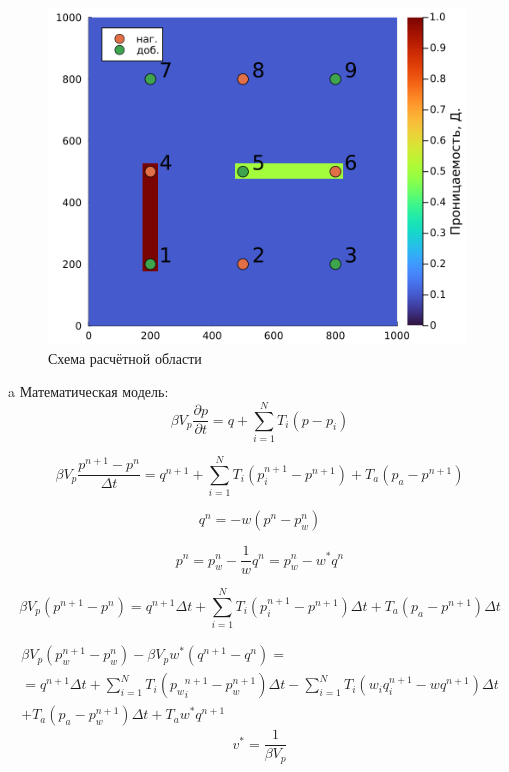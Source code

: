 \documentclass[14pt]{article}
\begin{document}
\begin{figure}
	\centering
	\includegraphics[width=0.7\linewidth]{pic/screenshot001}
	\caption{Схема расчётной области}
	\label{fig:screenshot001}
\end{figure}
a
	Математическая модель:
\begin{equation}\label{mm}
	\beta V_p\frac{\partial p}{\partial t} = q + \sum_{i=1}^{N}T_i\left(p-p_i\right)
\end{equation}

\begin{equation}\label{mm1}
	\beta V_p\frac{p^{n+1} - p^n}{\Delta t} = q^{n+1} + \sum_{i=1}^{N}T_i\left(p_i^{n+1}-p^{n+1}\right) + T_a\left(p_a - p^{n+1}\right)
\end{equation}

\begin{equation}
	q^n = -w\left(p^n-p_w^n\right)
\end{equation}


\begin{equation}
	p^n = p_w^n - \frac{1}{w}q^n = p_w^n - w^*q^n 
\end{equation}

\begin{equation}
	\beta V_p \left(p^{n+1} - p^n\right) = q^{n+1}\Delta t + \sum_{i=1}^{N}T_i\left(p_i^{n+1}-p^{n+1}\right)\Delta t + T_a\left(p_a - p^{n+1}\right)\Delta t
\end{equation}
	
\begin{eqnarray*}\label{mm2}
	\beta V_p \left(p_w^{n+1} - p_w^n\right) - \beta V_p w^*\left(q^{n+1} - q^n\right) = \\
	= q^{n+1}\Delta t + \sum_{i=1}^{N} T_i \left({p_w}_i^{n+1}-p_w^{n+1}\right)\Delta t - 
	\sum_{i=1}^{N} T_i \left(w_i q_i^{n+1}-w q^{n+1}\right)\Delta t \\
	+  T_a\left(p_a - p_w^{n+1}\right)\Delta t + T_a w^* q^{n+1}
\end{eqnarray*}
\begin{equation*}
	v^* = \frac{1}{\beta V_p}
\end{equation*}
\end{document}
